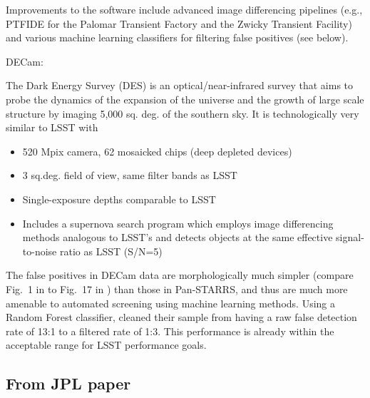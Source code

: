 Improvements to the software include advanced image differencing
pipelines (e.g., PTFIDE for the Palomar Transient Factory and the
Zwicky Transient Facility) and various machine learning classifiers
for filtering false positives (see below). 

DECam: \cite{goldstein15} 

The Dark Energy Survey (DES) is an optical/near-infrared survey that
aims to probe the dynamics of the expansion of the universe and the
growth of large scale structure by imaging 5,000 sq. deg. of the
southern sky. It is technologically very similar to LSST with
\begin{itemize}
\item 520 Mpix camera, 62 mosaicked chips (deep depleted devices)
\item 3 sq.deg. field of view, same filter bands as LSST
\item Single-exposure depths comparable to LSST
\item Includes a supernova search program which employs image
differencing methods analogous to LSST’s  and detects objects at the 
same effective signal-to-noise ratio as LSST (S/N=5)
\end{itemize} 

The false positives in DECam data are morphologically much simpler
(compare Fig.~1 in \citep{goldstein15} to Fig.~17 in \citep{denneau13})
than those in Pan-STARRS, and thus are much more amenable to automated 
screening using machine learning methods. Using a Random Forest 
classifier, \cite{goldstein15} cleaned their sample from having a 
raw false detection rate of 13:1 to a filtered rate of 1:3. This performance
is already within the acceptable range for LSST performance goals. 






\subsection{From JPL paper}

